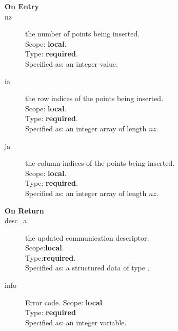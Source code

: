 %
%


\begin{description}
\item[\bf On Entry]
\item[nz] the number of points being inserted.\\
Scope: {\bf local}.\\
Type: {\bf required}.\\
Specified as: an integer value.
\item[ia] the row indices of the points being inserted.\\
Scope: {\bf local}.\\
Type: {\bf required}.\\
Specified as: an integer array of length $nz$.
\item[ja] the column indices of the points being inserted.\\
Scope: {\bf local}.\\
Type: {\bf required}.\\
Specified as: an integer array of length $nz$.
\end{description}

\begin{description}
\item[\bf On Return]
\item[desc\_a] the updated communication descriptor.\\
Scope:{\bf local}.\\
Type:{\bf required}.\\
Specified as: a structured data of type \descdata.
\item[info] Error code.
Scope: {\bf local} \\
Type: {\bf required}\\
Specified as: an integer variable.
\end{description}
